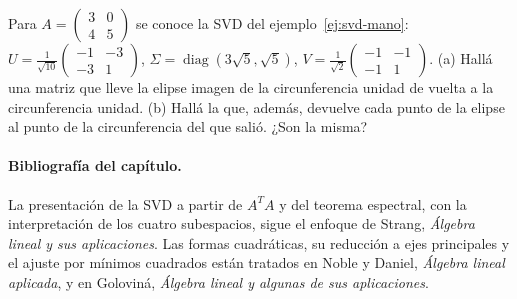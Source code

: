 \begin{ejercicio}\label{ex:svd-desdeformar}
Para \(A=\begin{pmatrix}3&0\\4&5\end{pmatrix}\) se conoce la SVD del
ejemplo~\ref{ej:svd-mano}: \(U=\frac1{\sqrt{10}}\left(\begin{smallmatrix}-1&-3\\-3&1\end{smallmatrix}\right)\),
\(\Sigma=\operatorname{diag}(3\sqrt5,\sqrt5)\),
\(V=\frac1{\sqrt2}\left(\begin{smallmatrix}-1&-1\\-1&1\end{smallmatrix}\right)\).
(a) Hallá una matriz que lleve la elipse imagen de la circunferencia unidad de vuelta a la
circunferencia unidad. (b) Hallá la que, además, devuelve cada punto de la elipse al punto
de la circunferencia del que salió. ¿Son la misma?
\end{ejercicio}

\paragraph{Bibliografía del capítulo.} La presentación de la SVD a partir de \(A^TA\) y del
teorema espectral, con la interpretación de los cuatro subespacios, sigue el enfoque de
Strang, \emph{Álgebra lineal y sus aplicaciones}. Las formas cuadráticas, su reducción a
ejes principales y el ajuste por mínimos cuadrados están tratados en Noble y Daniel,
\emph{Álgebra lineal aplicada}, y en Goloviná, \emph{Álgebra lineal y algunas de sus
aplicaciones}.
